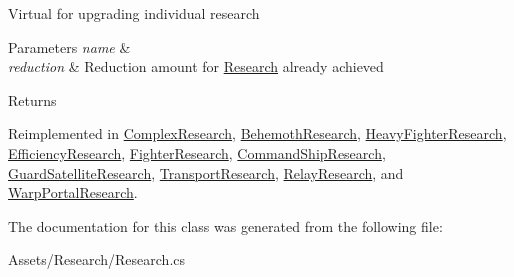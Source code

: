 Virtual for upgrading individual research 


\begin{DoxyParams}{Parameters}
{\em name} & \\
\hline
{\em reduction} & Reduction amount for \hyperlink{class_research}{Research} already achieved\\
\hline
\end{DoxyParams}
\begin{DoxyReturn}{Returns}

\end{DoxyReturn}


Reimplemented in \hyperlink{class_complex_research_a310412a49ffc06dfc21b7bb9777199d1}{Complex\+Research}, \hyperlink{class_behemoth_research_a46f83061d749e4b6cc7d7704460c0f29}{Behemoth\+Research}, \hyperlink{class_heavy_fighter_research_aad96c063ea5f6e3b473f4bd9dd7dcc86}{Heavy\+Fighter\+Research}, \hyperlink{class_efficiency_research_adf0a3b0d4af0e434b6a01d8f6142182b}{Efficiency\+Research}, \hyperlink{class_fighter_research_afd5beebea869ceeb759f36689cd2525b}{Fighter\+Research}, \hyperlink{class_command_ship_research_a17c455c45c0551795ed2dac84d10a9b2}{Command\+Ship\+Research}, \hyperlink{class_guard_satellite_research_aa69bdb692be9ee8ff073a3f963fc4045}{Guard\+Satellite\+Research}, \hyperlink{class_transport_research_a623f99655f4ac62ec9e1e8f4b9080cd7}{Transport\+Research}, \hyperlink{class_relay_research_a0262fccebce475efa4ab3d376b4a45ae}{Relay\+Research}, and \hyperlink{class_warp_portal_research_a2571a9c698b8874910de790e6d610a17}{Warp\+Portal\+Research}.



The documentation for this class was generated from the following file\+:\begin{DoxyCompactItemize}
\item 
Assets/\+Research/Research.\+cs\end{DoxyCompactItemize}
